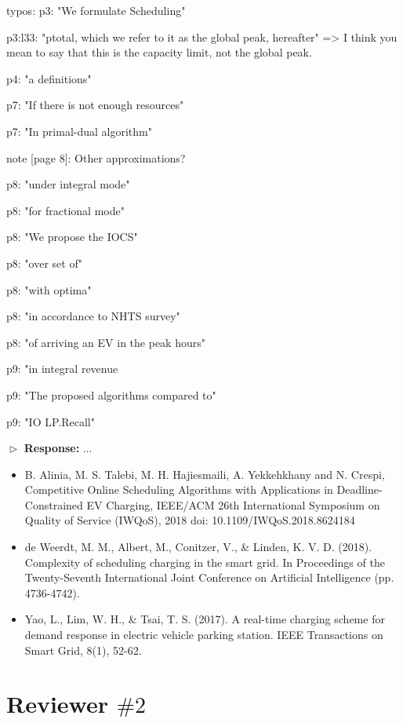 \documentclass[11pt]{article}
\begin{document}
\vspace{3mm}
{\color{blue} typos:
p3: "We formulate Scheduling"

p3:l33: "ptotal, which we refer to it as the global peak, hereafter" => I think you mean to say that this is the capacity limit, not the global peak.

p4: "a definitions"

p7: "If there is not enough resources"

p7: "In primal-dual algorithm"

note [page 8]: Other approximations?

p8: "under integral mode"

p8: "for fractional mode"

p8: "We propose the IOCS"

p8: "over set of"

p8: "with optima"

p8: "in accordance to NHTS survey"

p8: "of arriving an EV in the peak hours"

p9: "in integral revenue

p9: "The proposed algorithms compared to"

p9: "IO LP.Recall"
 }
\vspace{3mm}

$\vartriangleright$ \noindent\textbf{Response:} 
...


\begin{itemize}
\item B. Alinia, M. S. Talebi, M. H. Hajiesmaili, A. Yekkehkhany and N. Crespi, Competitive Online Scheduling Algorithms with Applications in Deadline-Constrained EV Charging, IEEE/ACM 26th International Symposium on Quality of Service (IWQoS), 2018
doi: 10.1109/IWQoS.2018.8624184

\item de Weerdt, M. M., Albert, M., Conitzer, V., \& Linden, K. V. D. (2018). Complexity of scheduling charging in the smart grid. In Proceedings of the Twenty-Seventh International Joint Conference on Artificial Intelligence (pp. 4736-4742).

\item Yao, L., Lim, W. H., \& Tsai, T. S. (2017). A real-time charging scheme for demand response in electric vehicle parking station. IEEE Transactions on Smart Grid, 8(1), 52-62.
\end{itemize}

\newpage
\section{Reviewer $\# 2$}
\end{document}
